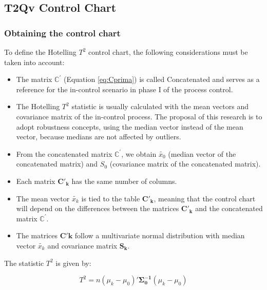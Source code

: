 \documentclass[mathematics,article,submit,moreauthors,pdftex]{mdpi}
\providecommand{\tightlist}{%
  \setlength{\itemsep}{0pt}\setlength{\parskip}{4pt}}
\begin{document}
\hypertarget{t2qv-control-chart}{%
\subsection{T2Qv Control Chart}\label{t2qv-control-chart}}

\hypertarget{obtaining-the-control-chart}{%
\subsubsection{Obtaining the control
chart}\label{obtaining-the-control-chart}}

To define the Hotelling \(T^2\) control chart, the following
considerations must be taken into account:

\begin{itemize}
\tightlist
\item
  The matrix \(\mathbb{C}^{'}\) (Equation \ref{eq:Cprima}) is called
  Concatenated and serves as a reference for the in-control scenario in
  phase I of the process control.
\item
  The Hotelling \(T^2\) statistic is usually calculated with the mean
  vectors and covariance matrix of the in-control process. The proposal
  of this research is to adopt robustness concepts, using the median
  vector instead of the mean vector, because medians are not affected by
  outliers.
\item
  From the concatenated matrix \(\mathbb{C}^{'}\), we obtain
  \(\tilde{x_{0}}\) (median vector of the concatenated matrix) and
  \(S_0\) (covariance matrix of the concatenated matrix).
\item
  Each matrix \(\mathbf{C'_k}\) has the same number of columns.
\item
  The mean vector \(\tilde{x_{k}}\) is tied to the table
  \(\mathbf{C'_k}\), meaning that the control chart will depend on the
  differences between the matrices \(\mathbf{C'_k}\) and the
  concatenated matrix \(\mathbf{\mathbb{C^{'}}}\).
\item
  The matrices \(\mathbf{C'k}\) follow a multivariate normal
  distribution with median vector \(\tilde{x_{k}}\) and covariance
  matrix \(\mathbf{S_k}\).
\end{itemize}

The statistic \(T^2\) is given by:

\begin{equation}
T^2=n (\mu_{k}-\mu_{0})'\mathbf{\Sigma_{0}^{-1}}(\mu_{k}-\mu_{0})
\label{eq:T2}
\end{equation}
\end{document}

